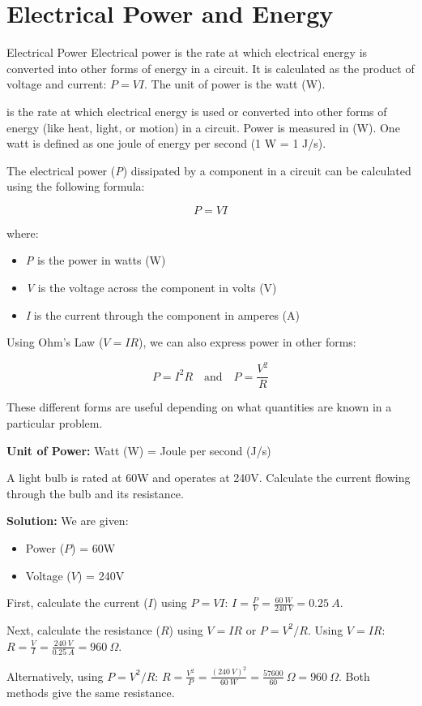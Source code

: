 \section{Electrical Power and Energy}

\begin{keyconcept}{Electrical Power}
Electrical power is the rate at which electrical energy is converted into other forms of energy in a circuit. It is calculated as the product of voltage and current: $P = VI$. The unit of power is the watt (W). 
\end{keyconcept}

 is the rate at which electrical energy is used or converted into other forms of energy (like heat, light, or motion) in a circuit.  Power is measured in  (W). One watt is defined as one joule of energy per second (1 W = 1 J/s).

The electrical power (\textit{P}) dissipated by a component in a circuit can be calculated using the following formula:

$$P = VI$$

where:
\begin{itemize}
    \item \textit{P} is the power in watts (W)
    \item \textit{V} is the voltage across the component in volts (V)
    \item \textit{I} is the current through the component in amperes (A)
\end{itemize}

Using Ohm's Law ($V=IR$), we can also express power in other forms:

$$P = I^2R \quad \text{and} \quad P = \frac{V^2}{R}$$

These different forms are useful depending on what quantities are known in a particular problem.

\begin{marginnote}
\textbf{Unit of Power:}
Watt (W) = Joule per second (J/s)
\end{marginnote}

\begin{example}
A light bulb is rated at 60W and operates at 240V. Calculate the current flowing through the bulb and its resistance.

\textbf{Solution:}
We are given:
\begin{itemize}
    \item Power ($P$) = 60W
    \item Voltage ($V$) = 240V
\end{itemize}
First, calculate the current ($I$) using $P = VI$:
$I = \frac{P}{V} = \frac{60\ W}{240\ V} = 0.25\ A$.

Next, calculate the resistance ($R$) using $V = IR$ or $P = V^2/R$. Using $V = IR$:
$R = \frac{V}{I} = \frac{240\ V}{0.25\ A} = 960\ \Omega$.

Alternatively, using $P = V^2/R$:
$R = \frac{V^2}{P} = \frac{(240\ V)^2}{60\ W} = \frac{57600}{60}\ \Omega = 960\ \Omega$.
Both methods give the same resistance.
\end{example}

